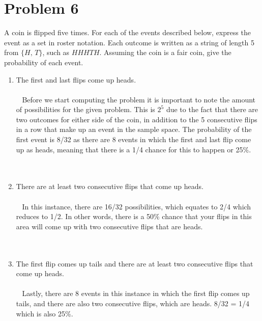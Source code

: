 \section*{Problem 6}
A coin is flipped five times. For each of the events described below, express the event as a set in roster notation. Each outcome is written as a string of length 5 from $\{H,\, T\}$, such as $HHHTH$. Assuming the coin is a fair coin, give the probability of each event.\\
\begin{enumerate}[label=(\alph*)]
\item The first and last flips come up heads.\\\\\
Before we start computing the problem it is important to note the amount of possibilities for the given problem. This is $2^{5}$ due to the fact that there are two outcomes for either side of the coin, in addition to the 5 consecutive flips in a row that make up an event in the sample space. The probability of the first event is 8/32 as there are 8 events in which the first and last flip come up as heads, meaning that there is a 1/4 chance for this to happen or 25\%.
\\\\\
\item There are at least two consecutive flips that come up heads.\\\\\
In this instance, there are 16/32 possibilities, which equates to 2/4 which reduces to 1/2. In other words, there is a 50\% chance that your flips in this area will come up with two consecutive flips that are heads.
\\\\\
\item The first flip comes up tails and there are at least two consecutive flips that come up heads.\\\\\
Lastly, there are 8 events in this instance in which the first flip comes up tails, and there are also two consecutive flips, which are heads. 8/32 = 1/4 which is also 25\%.
\\\\\
\end{enumerate}

 \newpage


